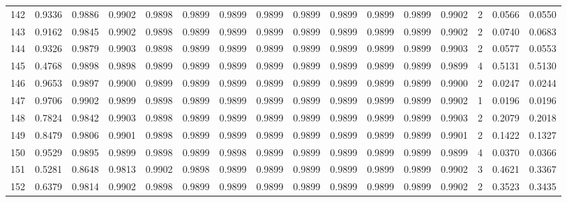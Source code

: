\begin{tabular}{lrrrrrrrrrrrrrrr}
142 &      0.9336 &  0.9886 &  0.9902 &  0.9898 &  0.9899 &  0.9899 &  0.9899 &  0.9899 &  0.9899 &  0.9899 &   0.9899 &     0.9902 &      2 &                    0.0566 &                     0.0550 \\
143 &      0.9162 &  0.9845 &  0.9902 &  0.9898 &  0.9899 &  0.9899 &  0.9899 &  0.9899 &  0.9899 &  0.9899 &   0.9899 &     0.9902 &      2 &                    0.0740 &                     0.0683 \\
144 &      0.9326 &  0.9879 &  0.9903 &  0.9898 &  0.9899 &  0.9899 &  0.9899 &  0.9899 &  0.9899 &  0.9899 &   0.9899 &     0.9903 &      2 &                    0.0577 &                     0.0553 \\
145 &      0.4768 &  0.9898 &  0.9898 &  0.9899 &  0.9899 &  0.9899 &  0.9899 &  0.9899 &  0.9899 &  0.9899 &   0.9899 &     0.9899 &      4 &                    0.5131 &                     0.5130 \\
146 &      0.9653 &  0.9897 &  0.9900 &  0.9899 &  0.9899 &  0.9899 &  0.9899 &  0.9899 &  0.9899 &  0.9899 &   0.9899 &     0.9900 &      2 &                    0.0247 &                     0.0244 \\
147 &      0.9706 &  0.9902 &  0.9899 &  0.9898 &  0.9899 &  0.9899 &  0.9899 &  0.9899 &  0.9899 &  0.9899 &   0.9899 &     0.9902 &      1 &                    0.0196 &                     0.0196 \\
148 &      0.7824 &  0.9842 &  0.9903 &  0.9898 &  0.9899 &  0.9899 &  0.9899 &  0.9899 &  0.9899 &  0.9899 &   0.9899 &     0.9903 &      2 &                    0.2079 &                     0.2018 \\
149 &      0.8479 &  0.9806 &  0.9901 &  0.9898 &  0.9899 &  0.9899 &  0.9899 &  0.9899 &  0.9899 &  0.9899 &   0.9899 &     0.9901 &      2 &                    0.1422 &                     0.1327 \\
150 &      0.9529 &  0.9895 &  0.9899 &  0.9898 &  0.9899 &  0.9898 &  0.9899 &  0.9899 &  0.9899 &  0.9899 &   0.9899 &     0.9899 &      4 &                    0.0370 &                     0.0366 \\
151 &      0.5281 &  0.8648 &  0.9813 &  0.9902 &  0.9898 &  0.9899 &  0.9899 &  0.9899 &  0.9899 &  0.9899 &   0.9899 &     0.9902 &      3 &                    0.4621 &                     0.3367 \\
152 &      0.6379 &  0.9814 &  0.9902 &  0.9898 &  0.9899 &  0.9899 &  0.9899 &  0.9899 &  0.9899 &  0.9899 &   0.9899 &     0.9902 &      2 &                    0.3523 &                     0.3435 \\

\end{tabular}
